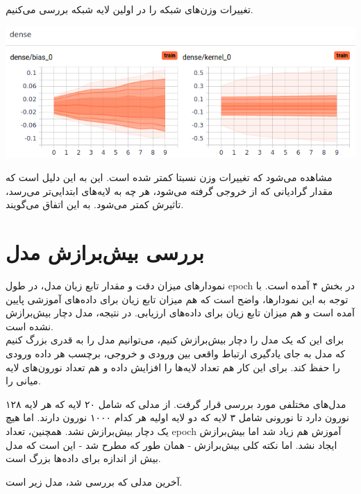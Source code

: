 \documentclass{article}
\begin{document}
تغییرات وزن‌های شبکه را در اولین لایه شبکه بررسی می‌کنیم.

\begin{center}
	\includegraphics[scale=0.60]{tanh.png} 
\end{center}    

مشاهده می‌شود که تغییرات وزن  نسبتا کمتر شده است. این به این دلیل است که مقدار گرادیانی که از خروجی گرفته می‌شود، هر چه به لایه‌های ابتدایی‌تر می‌رسد، تاثیرش کمتر می‌شود. به این اتفاق  می‌گویند.






\section{
بررسی بیش‌برازش مدل
}


نمودارهای میزان دقت و مقدار تابع زیان مدل، در طول epoch در بخش ۴ آمده است. با توجه به این نمودارها، واضح است که هم میزان تابع زیان برای داده‌های آموزشی پایین آمده است و هم میزان تابع زیان برای داده‌های ارزیابی. در نتیجه، مدل دچار بیش‌برازش نشده است. \\

برای این که یک مدل را دچار بیش‌برازش کنیم، می‌توانیم مدل را به قدری بزرگ کنیم که مدل به جای یادگیری ارتباط واقعی بین ورودی و خروجی، برچسب هر داده ورودی را حفظ کند. برای این کار هم تعداد لایه‌ها را افزایش داده و هم تعداد نورون‌های لایه میانی را.

مدل‌های مختلفی مورد بررسی قرار گرفت. از مدلی که شامل ۲۰ لایه که هر لایه ۱۲۸ نورون دارد تا نورونی شامل ۳ لایه که دو لایه اولیه هر کدام ۱۰۰۰ نورون دارند. اما هیچ یک دچار بیش‌برازش نشد. همچنین، تعداد epoch آموزش هم زیاد شد اما بیش‌برازش ایجاد نشد.  اما نکته کلی بیش‌برازش - همان طور که مطرح شد - این است که مدل بیش از اندازه برای داده‌ها بزرگ است. 

آخرین مدلی که بررسی شد، مدل زیر است.
\end{document}

